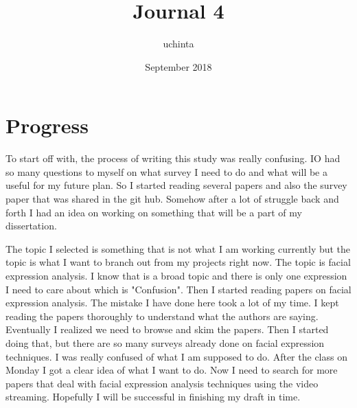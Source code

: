 \documentclass{article}
\title{Journal 4}
\author{uchinta }
\date{September 2018}
\begin{document}
\maketitle

\section{Progress}
To start off with, the process of writing this study was really confusing. IO had so many questions to myself on what survey I need to do and what will be a useful for my future plan. So I started reading several papers and also the survey paper that was shared in the git hub. Somehow after a lot of struggle back and forth I had an idea on working on something that will be a part of my dissertation.

The topic I selected is something that is not what I am working currently but the topic is what I want to branch out from my projects right now. The topic is facial expression analysis. I know that is a broad topic and there is only one expression I need to care about which is "Confusion". Then I started reading papers on facial expression analysis. The mistake I have done here took a lot of my time. I kept reading the papers thoroughly to understand what the authors are saying. Eventually I realized we need to browse and skim the papers. Then I started doing that, but there are so many surveys already done on facial expression techniques. I was really confused of what I am supposed to do. After the class on Monday I got a clear idea of what I want to do. Now I need to search for more papers that deal with facial expression analysis techniques using the video streaming. Hopefully I will be successful in finishing my draft in time.   
\end{document}
